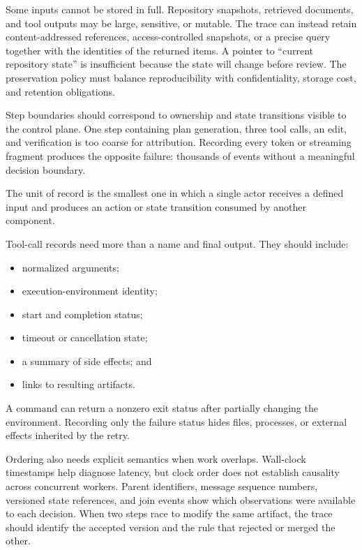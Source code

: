 Some inputs cannot be stored in full. Repository snapshots, retrieved documents, and tool outputs may be large, sensitive, or mutable. The trace can instead retain content-addressed references, access-controlled snapshots, or a precise query together with the identities of the returned items. A pointer to ``current repository state'' is insufficient because the state will change before review. The preservation policy must balance reproducibility with confidentiality, storage cost, and retention obligations.

Step boundaries should correspond to ownership and state transitions visible to the control plane. One step containing plan generation, three tool calls, an edit, and verification is too coarse for attribution. Recording every token or streaming fragment produces the opposite failure: thousands of events without a meaningful decision boundary.

The unit of record is the smallest one in which a single actor receives a defined input and produces an action or state transition consumed by another component.


Tool-call records need more than a name and final output. They should include:

\begin{itemize}
\tightlist
\item
  normalized arguments;
\item
  execution-environment identity;
\item
  start and completion status;
\item
  timeout or cancellation state;
\item
  a summary of side effects; and
\item
  links to resulting artifacts.
\end{itemize}

A command can return a nonzero exit status after partially changing the environment. Recording only the failure status hides files, processes, or external effects inherited by the retry.

Ordering also needs explicit semantics when work overlaps. Wall-clock timestamps help diagnose latency, but clock order does not establish causality across concurrent workers. Parent identifiers, message sequence numbers, versioned state references, and join events show which observations were available to each decision. When two steps race to modify the same artifact, the trace should identify the accepted version and the rule that rejected or merged the other.

